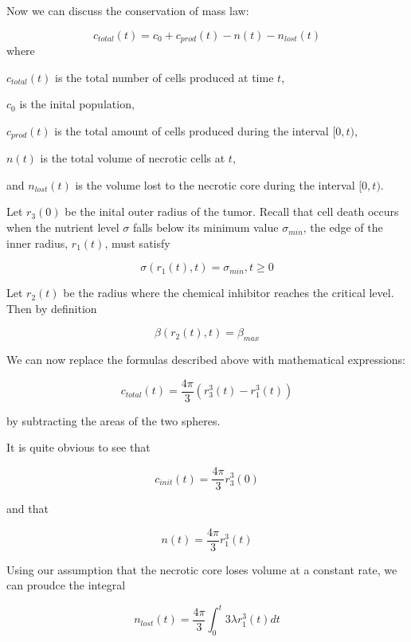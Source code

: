 \documentclass{article}
\begin{document}
Now we can discuss the conservation of mass law:

\begin{equation}
    c_{total}(t) = c_0 + c_{prod}(t) - n(t) - n_{lost}(t)
\end{equation}
where

$c_{total}(t)$ is the total number of cells produced at time $t$,

$c_0$ is the inital population,

$c_{prod}(t)$ is the total amount of cells produced during the interval $[0, t)$,

$n(t)$ is the total volume of necrotic cells at $t$,

and $n_{lost}(t)$ is the volume lost to the necrotic core during the interval $[0, t)$.

Let $r_3(0)$ be the inital outer radius of the tumor. Recall that cell death occurs when the nutrient level $\sigma$ falls below
its minimum value $\sigma_{min}$, the edge of the inner radius, $r_1(t)$, must satisfy

\begin{equation}
    \sigma(r_1(t), t) = \sigma_{min}, t \geq 0
\end{equation}

Let $r_2(t)$ be the radius where the chemical inhibitor reaches the critical level. Then by definition

\begin{equation}
    \beta(r_2(t), t) = \beta_{max}
\end{equation}

We can now replace the formulas described above with mathematical expressions:

\begin{equation}
    c_{total}(t) = \frac{4\pi}{3}(r_3^3(t) - r_1^3(t))
\end{equation}

by subtracting the areas of the two spheres.

It is quite obvious to see that

\begin{equation}
    c_{init}(t) = \frac{4\pi}{3}r_3^3(0)
\end{equation}

and that

\begin{equation}
    n(t) = \frac{4\pi}{3}r_1^3(t)
\end{equation}

Using our assumption that the necrotic core loses volume at a constant rate, we can proudce the integral

\begin{equation}
    n_{lost}(t) = \frac{4\pi}{3} \int_{0}^{t}3\lambda r_1^3(t) dt
\end{equation}
\end{document}
